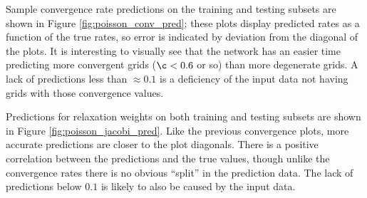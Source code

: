 \documentclass[review]{siamart190516}
\begin{document}
Sample convergence rate predictions on the training and testing subsets are shown in Figure \ref{fig:poisson_conv_pred}; these plots display predicted rates as a function of the true rates, so error is indicated by deviation from the diagonal of the plots.  It is interesting to visually see that the network has an easier time predicting more convergent grids ($\c < 0.6$ or so) than more degenerate grids.  A lack of predictions less than $\approx 0.1$ is a deficiency of the input data not having grids with those convergence values.

Predictions for relaxation weights on both training and testing subsets are shown in Figure \ref{fig:poisson_jacobi_pred}.  Like the previous convergence plots, more accurate predictions are closer to the plot diagonals.  There is a positive correlation between the predictions and the true values, though unlike the convergence rates there is no obvious ``split'' in the prediction data.  The lack of predictions below $0.1$ is likely to also be caused by the input data.
\end{document}
